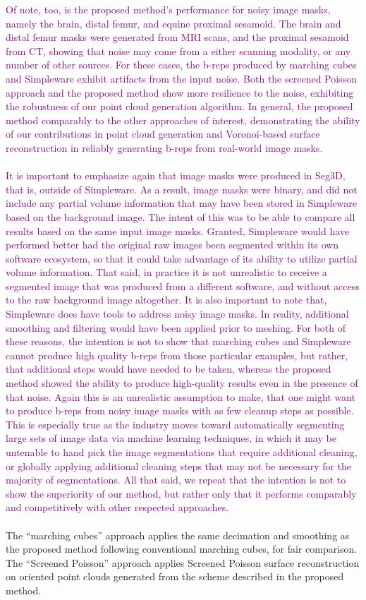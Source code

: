 \textcolor{purple}{Of note, too, is the proposed method's performance for noisy image masks, namely the brain, distal femur, and equine proximal sesamoid. The brain and distal femur masks were generated from MRI scans, and the proximal sesamoid from CT, showing that noise may come from a either scanning modality, or any number of other sources. For these cases, the b-reps produced by marching cubes and Simpleware exhibit artifacts from the input noise. Both the screened Poisson approach and the proposed method show more resilience to the noise, exhibiting the robustness of our point cloud generation algorithm. In general, the proposed method comparably to the other approaches of interest, demonstrating the ability of our contributions in point cloud generation and Voronoi-based surface reconstruction in reliably generating b-reps from real-world image masks. \\ \\
%
It is important to emphasize again that image masks were produced in Seg3D, that is, outside of Simpleware. As a result, image masks were binary, and did not include any partial volume information that may have been stored in Simpleware based on the background image. The intent of this was to be able to compare all results based on the same input image masks. Granted, Simpleware would have performed better had the original raw images been segmented within its own software ecosystem, so that it could take advantage of its ability to utilize partial volume information. That said, in practice it is not unrealistic to receive a segmented image that was produced from a different software, and without access to the raw background image altogether. It is also important to note that, Simpleware does have tools to address noisy image masks. In reality, additional smoothing and filtering would have been applied prior to meshing. For both of these reasons, the intention is not to show that marching cubes and Simpleware cannot produce high quality b-reps from those particular examples, but rather, that additional steps would have needed to be taken, whereas the proposed method showed the ability to produce high-quality results even in the presence of that noise. Again this is an unrealistic assumption to make, that one might want to produce b-reps from noisy image masks with as few cleanup steps as possible. This is especially true as the industry moves toward automatically segmenting large sets of image data via machine learning techniques, in which it may be untenable to hand pick the image segmentations that require additional cleaning, or globally applying additional cleaning steps that may not be necessary for the majority of segmentations. All that said, we repeat that the intention is not to show the superiority of our method, but rather only that it performs comparably and competitively with other respected approaches.} \\ \\
%
The ``marching cubes'' approach applies the same decimation and smoothing as the proposed method following conventional marching cubes, for fair comparison. The ``Screened Poisson'' approach applies Screened Poisson surface reconstruction on oriented point clouds generated from the scheme described in the proposed method.